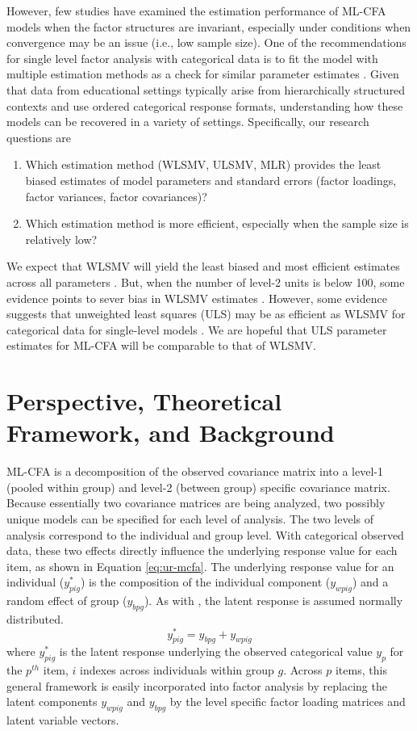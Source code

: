 \documentclass[man, noextraspace, 12pt]{apa7}
\begin{document}
However, few studies have examined the estimation performance of ML-CFA models when the factor structures are invariant, especially under conditions when convergence may be an issue (i.e., low sample size).
One of the recommendations for single level factor analysis with categorical data is to fit the model with multiple estimation methods as a check for similar parameter estimates \citep{Finney2013}.
Given that data from educational settings typically arise from hierarchically structured contexts and use ordered categorical response formats, understanding how these models can be recovered in a variety of settings.
Specifically, our research questions are
\begin{enumerate}
\item Which estimation method (WLSMV, ULSMV, MLR) provides the least biased estimates of model parameters and standard errors (factor loadings, factor variances, factor covariances)?
\item Which estimation method is more efficient, especially when the sample size is relatively low?
\end{enumerate} 
We expect that WLSMV will yield the least biased and most efficient estimates across all parameters \citep{Hox2010, DiStefano2014, Asparouhov2007}.
But, when the number of level-2 units is below 100, some evidence points to sever bias in WLSMV estimates \citep{Navruz2016}.
However, some evidence suggests that unweighted least squares (ULS) may be as efficient as WLSMV for categorical data for single-level models \citep{Forero2009}.
We are hopeful that ULS parameter estimates for ML-CFA will be comparable to that of WLSMV.

\section{Perspective, Theoretical Framework, and Background}

ML-CFA is a decomposition of the observed covariance matrix into a level-1 (pooled within group) and level-2 (between group) specific covariance matrix. 
Because essentially two covariance matrices are being analyzed, two possibly unique models can be specified for each level of analysis.
The two levels of analysis correspond to the individual and group level.
With categorical observed data, these two effects directly influence the underlying response value for each item, as shown in Equation \ref{eq:ur-mcfa}.
The underlying response value for an individual ($y^{*}_{pig}$) is the composition of the individual component ($y_{wpig}$) and a random effect of group ($y_{bpg}$). 
As with \cite{Muthen1984}, the latent response is assumed normally distributed.
\begin{equation}\label{eq:ur-mcfa}
y^{*}_{pig} = y_{bpg} + y_{wpig}
\end{equation}
where $y^{*}_{pig}$ is the latent response underlying the observed categorical value $y_p$ for the $p^{th}$ item, $i$ indexes across individuals within group $g$.
Across $p$ items, this general framework is easily incorporated into factor analysis by replacing the latent components $y_{wpig}$ and $y_{bpg}$ by the level specific factor loading matrices and latent variable vectors.
\end{document}

